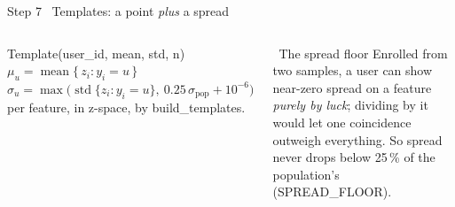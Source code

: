 \documentclass[aspectratio=169,11pt,t]{beamer}
\newcommand\code[1]{{\ttfamily\color{terradk}#1}}
\begin{document}
\begin{frame}{Step 7 \textperiodcentered\ Templates: a point \emph{plus} a spread}
\begin{columns}[c,onlytextwidth]
\begin{card}[terra]{\ttfamily Template(user\_id, mean, std, n)}
\scriptsize
\(\mu_u = \operatorname{mean}\{\, z_i : y_i = u \,\}\)\\[4pt]
\(\sigma_u = \max\!\big(\operatorname{std}\{ z_i : y_i = u \},\ 0.25\,\sigma_{\text{pop}} + 10^{-6}\big)\)\\[3pt]
{\scriptsize per feature, in z-space, by \code{build\_templates}.}
\end{card}
\begin{card}[amber]{\ The spread floor}
\scriptsize Enrolled from two samples, a user can show near-zero spread on a feature \emph{purely by luck}; dividing by it
would let one coincidence outweigh everything. So spread never drops below 25\,\% of the population's (\code{SPREAD\_FLOOR}).
\end{card}
\end{columns}
\end{frame}
\end{document}

